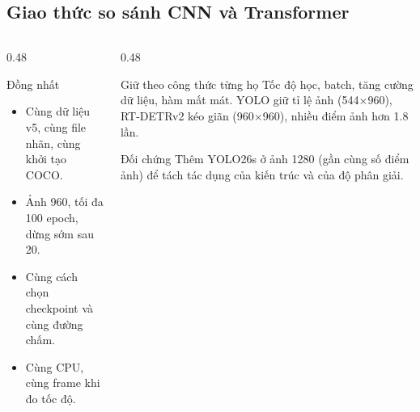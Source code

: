 \documentclass[aspectratio=\mlwAspectRatio, \mlwBaseSize, t]{beamer}
\begin{document}
\subsection{Giao thức so sánh CNN và Transformer}
\begin{frame}{\stitle}
  \begin{columns}[T]
    \begin{column}{0.48\textwidth}
      \begin{block}{Đồng nhất}
        \begin{itemize}
          \item Cùng dữ liệu v5, cùng file nhãn, cùng khởi tạo COCO.
          \item Ảnh 960, tối đa 100 epoch, dừng sớm sau 20.
          \item Cùng cách chọn checkpoint và cùng đường chấm.
          \item Cùng CPU, cùng frame khi đo tốc độ.
        \end{itemize}
      \end{block}
    \end{column}
    \begin{column}{0.48\textwidth}
      \begin{block}{Giữ theo công thức từng họ}
        Tốc độ học, batch, tăng cường dữ liệu, hàm mất mát. YOLO giữ tỉ lệ ảnh (544$\times$960), RT-DETRv2 kéo giãn
        (960$\times$960), nhiều điểm ảnh hơn 1.8 lần.
      \end{block}
      \begin{block}{Đối chứng}
        Thêm \alert{YOLO26s ở ảnh 1280} (gần cùng số điểm ảnh) để tách tác dụng của kiến trúc và của độ phân giải.
      \end{block}
    \end{column}
  \end{columns}
\end{frame}
\end{document}
